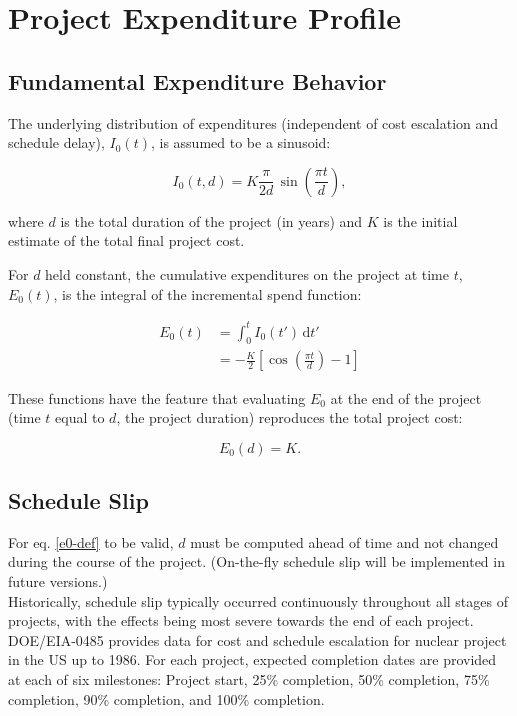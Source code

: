 \documentclass{article}
\begin{document}
\section{Project Expenditure Profile}

\subsection{Fundamental Expenditure Behavior}

The underlying distribution of expenditures (independent of cost escalation and schedule delay), $I_0(t)$, is assumed to be a sinusoid:

\begin{equation}
  I_0(t,d) = K \frac{\pi}{2d} \, \sin\left( \frac{\pi t}{d} \right),
\end{equation}

where $d$ is the total duration of the project (in years) and $K$ is the initial estimate of the total final project cost.

For $d$ held constant, the cumulative expenditures on the project at time $t$, $E_0(t)$, is the integral of the incremental spend function:

\begin{equation} \label{e0-def}
  \begin{split}
    E_0(t) & = \int_0^t {I_0(t') \, \mathrm{d}t'} \\
      & = - \frac{K}{2} \left[ \cos \left( \frac{\pi t}{d} \right) - 1 \right]
  \end{split}
\end{equation}

These functions have the feature that evaluating $E_0$ at the end of the project (time $t$ equal to $d$, the project duration) reproduces the total project cost:

\begin{equation}
  E_0(d) = K.
\end{equation}


\subsection{Schedule Slip}
For eq. \eqref{e0-def} to be valid, $d$ must be computed ahead of time and not changed during the course of the project.
(On-the-fly schedule slip will be implemented in future versions.) \\

Historically, schedule slip typically occurred continuously throughout all stages of projects, with the effects being most severe towards the end of each project.
DOE/EIA-0485 provides data for cost and schedule escalation for nuclear project in the US up to 1986. 
For each project, expected completion dates are provided at each of six milestones: Project start, 25\% completion, 50\% completion, 75\% completion, 90\% completion, and 100\% completion. \\
\end{document}
